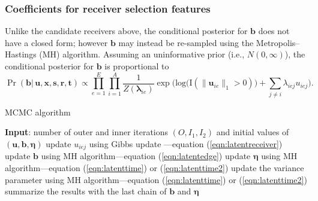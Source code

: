 \documentclass[ba]{imsart}
\def\spacingset#1{\renewcommand{\baselinestretch}%
	{#1}\small\normalsize} \spacingset{1}
\numberwithin{equation}{section}
\theoremstyle{plain}
\begin{document}
	\subsubsection{Coefficients for receiver selection features}
	Unlike the candidate receivers above, the conditional posterior for $\boldsymbol{b}$ does not have a closed form; however $\boldsymbol{b}$ may instead be re-sampled using the Metropolis--Hastings (MH) algorithm. Assuming an uninformative prior (i.e., $N({0},\infty)$), the conditional posterior for $\boldsymbol{b}$ is proportional to~
	\begin{equation}
		\Pr(\boldsymbol{b}| \,\boldsymbol{u}, \boldsymbol{x}, \boldsymbol{s}, \boldsymbol{r},\boldsymbol{t})\propto \prod_{e=1}^E
		\prod_{i=1}^A \frac{1}{Z(\boldsymbol{\lambda}_{ie})}\exp\Big(\mbox{log}\big(\text{I}( \lVert \boldsymbol{u}_{ie}\rVert_1 > 0)\big) + \sum\limits_{j \neq i} \lambda_{iej}u_{iej}\Big).
		\label{eqn:latentedge}
	\end{equation}
	\begin{algorithm}[!t]
		\spacingset{1}
		\SetAlgoLined
		\caption{MCMC algorithm}
		\begin{algorithmic}
			\STATE \textbf{Input}: number of outer and inner iterations $(O, I_1, I_2)$ and initial values of $(\boldsymbol{u}, \boldsymbol{b}, \boldsymbol{\eta})$
			\vskip 0.1in
			\STATE update $u_{iej}$ using Gibbs update ---equation (\ref{eqn:latentreceiver})
			\ENDFOR
			\ENDFOR
			\ENDFOR
			\STATE update $\boldsymbol{b}$ using MH algorithm---equation (\ref{eqn:latentedge})
			\ENDFOR
			\STATE update $\boldsymbol{\eta}$ using MH algorithm---equation (\ref{eqn:latenttime}) or (\ref{eqn:latenttime2}) 
			\ENDFOR
			\STATE update the variance parameter using MH algorithm---equation (\ref{eqn:latenttime}) or (\ref{eqn:latenttime2}) 
			\ENDIF
			\ENDFOR
			\STATE	summarize the results with the last chain of $\boldsymbol{b}$ and $\boldsymbol{\eta}$
		\end{algorithmic}
		\label{alg:MCMC}
	\end{algorithm}
\end{document}

